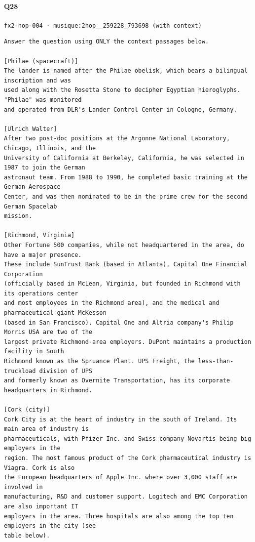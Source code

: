\documentclass[10pt]{article}
\begin{document}
\paragraph{Q28} \texttt{fx2-hop-004  ·  musique:2hop\_\_259228\_793698 (with context)}
\begin{verbatim}
Answer the question using ONLY the context passages below.

[Philae (spacecraft)]
The lander is named after the Philae obelisk, which bears a bilingual inscription and was
used along with the Rosetta Stone to decipher Egyptian hieroglyphs. "Philae" was monitored
and operated from DLR's Lander Control Center in Cologne, Germany.

[Ulrich Walter]
After two post-doc positions at the Argonne National Laboratory, Chicago, Illinois, and the
University of California at Berkeley, California, he was selected in 1987 to join the German
astronaut team. From 1988 to 1990, he completed basic training at the German Aerospace
Center, and was then nominated to be in the prime crew for the second German Spacelab
mission.

[Richmond, Virginia]
Other Fortune 500 companies, while not headquartered in the area, do have a major presence.
These include SunTrust Bank (based in Atlanta), Capital One Financial Corporation
(officially based in McLean, Virginia, but founded in Richmond with its operations center
and most employees in the Richmond area), and the medical and pharmaceutical giant McKesson
(based in San Francisco). Capital One and Altria company's Philip Morris USA are two of the
largest private Richmond-area employers. DuPont maintains a production facility in South
Richmond known as the Spruance Plant. UPS Freight, the less-than-truckload division of UPS
and formerly known as Overnite Transportation, has its corporate headquarters in Richmond.

[Cork (city)]
Cork City is at the heart of industry in the south of Ireland. Its main area of industry is
pharmaceuticals, with Pfizer Inc. and Swiss company Novartis being big employers in the
region. The most famous product of the Cork pharmaceutical industry is Viagra. Cork is also
the European headquarters of Apple Inc. where over 3,000 staff are involved in
manufacturing, R&D and customer support. Logitech and EMC Corporation are also important IT
employers in the area. Three hospitals are also among the top ten employers in the city (see
table below).


\end{verbatim}
\end{document}
